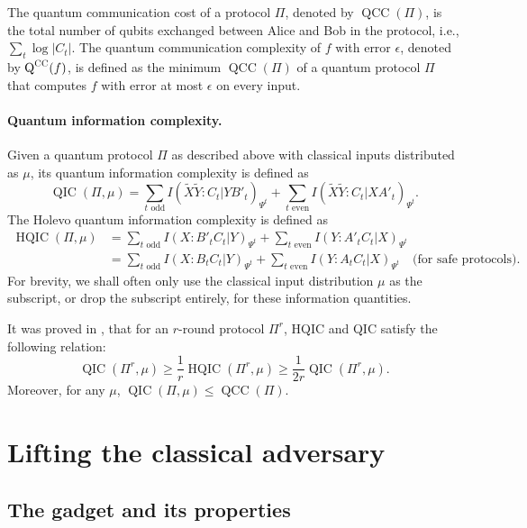 \documentclass[10pt,a4paper]{article}
\theoremstyle{definition}
\newcommand{\CC}{\textsc{CC}}
\renewcommand{\>}{\rangle}
\newcommand{\<}{\langle}
\newcommand{\tX}{\widetilde{X}}
\newcommand{\tY}{\widetilde{Y}}
\DeclareMathOperator{\Q}{Q}
\DeclareMathOperator{\QCC}{QCC}
\DeclareMathOperator{\QIC}{QIC}
\DeclareMathOperator{\HQIC}{HQIC}
\begin{document}
The quantum communication cost of a protocol $\Pi$, denoted by $\QCC(\Pi)$, is the total number of qubits exchanged between Alice and Bob in the protocol, i.e., $\sum_t\log|C_t|$. The quantum communication complexity of $f$ with error $\epsilon$, denoted by $\Q^\CC(f)$, is defined as the minimum $\QCC(\Pi)$ of a quantum protocol $\Pi$ that computes $f$ with error at most $\epsilon$ on every input.

\paragraph{Quantum information complexity.} Given a quantum protocol $\Pi$ as described above with classical inputs distributed as $\mu$, its quantum information complexity is defined as
\[ \QIC(\Pi,\mu) = \sum_{t \text{ odd}}I(\tX\tY:C_t|YB'_t)_{\Psi^t} + \sum_{t\text{ even}}I(\tX\tY:C_t|XA'_t)_{\Psi^t}.\]
The Holevo quantum information complexity is defined as
\begin{align*}
\HQIC(\Pi,\mu) & = \sum_{t\text{ odd}}I(X:B'_tC_t|Y)_{\Psi^t} + \sum_{t\text{ even}}I(Y:A'_tC_t|X)_{\Psi^t} \\
 & = \sum_{t\text{ odd}}I(X:B_tC_t|Y)_{\Psi^t} + \sum_{t\text{ even}}I(Y:A_tC_t|X)_{\Psi^t} \quad \text{(for safe protocols).}
\end{align*}
For brevity, we shall often only use the classical input distribution $\mu$ as the subscript, or drop the subscript entirely, for these information quantities.

It was proved in \cite{LT17}, that for an $r$-round protocol $\Pi^r$, HQIC and QIC satisfy the following relation:
\[ \QIC(\Pi^r, \mu) \geq \frac{1}{r}\HQIC(\Pi^r, \mu) \geq \frac{1}{2r}\QIC(\Pi^r,\mu).\]
Moreover, for any $\mu$, $\QIC(\Pi,\mu) \leq \QCC(\Pi)$.

\section{Lifting the classical adversary}

\subsection{The gadget and its properties}
\end{document}
